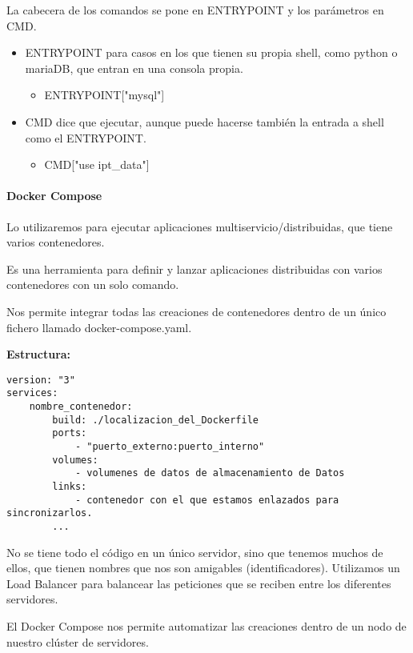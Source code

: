 \documentclass[12pt, twoside, openright]{report} %
\begin{document}
\begin{itemize}
	      La cabecera de los comandos se pone en ENTRYPOINT y los parámetros en CMD.
	      \begin{itemize}
		      \item ENTRYPOINT para casos en los que tienen su propia shell, como python o mariaDB, que entran en una consola propia.
		            \begin{itemize}
			            \item ENTRYPOINT["mysql"]
		            \end{itemize}
		      \item CMD dice que ejecutar, aunque puede hacerse también la entrada a shell como el ENTRYPOINT.
		            \begin{itemize}
			            \item CMD["use ipt\_data"]
		            \end{itemize}
	      \end{itemize}
\end{itemize}

\paragraph{Docker Compose}

Lo utilizaremos para ejecutar aplicaciones multiservicio/distribuidas, que tiene varios contenedores.

Es una herramienta para definir y lanzar aplicaciones distribuidas con varios contenedores con un solo comando.

Nos permite integrar todas las creaciones de contenedores dentro de un único fichero llamado docker-compose.yaml.

\textbf{Estructura:}
\begin{lstlisting}
version: "3"
services:
	nombre_contenedor:
		build: ./localizacion_del_Dockerfile
		ports:
			- "puerto_externo:puerto_interno"
		volumes:
			- volumenes de datos de almacenamiento de Datos
		links:
			- contenedor con el que estamos enlazados para sincronizarlos.
		...
\end{lstlisting}

No se tiene todo el código en un único servidor, sino que tenemos muchos de ellos, que tienen nombres que nos son amigables (identificadores).
Utilizamos un Load Balancer para balancear las peticiones que se reciben entre los diferentes servidores.

El Docker Compose nos permite automatizar las creaciones dentro de un nodo de nuestro clúster de servidores.
\end{document}
